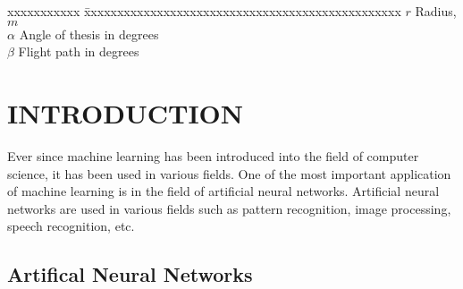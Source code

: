 \documentclass[BTech]{iitpdiss}
\begin{document}
\begin{singlespace}
\begin{tabbing}
xxxxxxxxxxx \= xxxxxxxxxxxxxxxxxxxxxxxxxxxxxxxxxxxxxxxxxxxxxxxx \kill
\textbf{$r$}  \> Radius, $m$ \\
\textbf{$\alpha$}  \> Angle of thesis in degrees \\
\textbf{$\beta$}   \> Flight path in degrees \\
\end{tabbing}
\end{singlespace}

\pagebreak
\clearpage




\chapter{INTRODUCTION}
\label{chap:intro}

Ever since machine learning has been introduced into the field of computer science, it has been used in various fields. One of the most important application of machine learning is in the field of artificial neural networks. Artificial neural networks are used in various fields such as pattern recognition, image processing, speech recognition, etc. 

\section{Artifical Neural Networks}

\begin{singlespace}

  
\end{singlespace}




%
\end{document}
